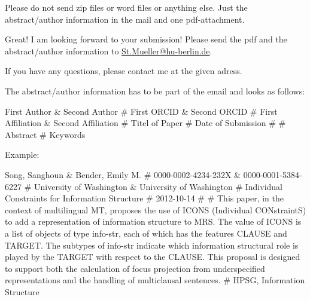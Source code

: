 \documentclass[11pt,a4paper,fleqn]{article}
\begin{document}
Please do not send zip files
or word files or anything else. Just the abstract/author information in the mail and one pdf-attachment.



Great! I am looking forward to your submission!
Please send the pdf and the abstract/author information to\newline
\href{mailto:St.Mueller@hu-berlin.de}{St.Mueller@hu-berlin.de}. 


If you have any questions, please contact me at the given adress.

\newpage

\noindent
The abstract/author information has to be part of the email and looks as follows:

First Author \& Second Author \# First ORCID \& Second ORCID \# First Affiliation \& Second Affiliation \# Titel of Paper \# Date of
Submission \# \# Abstract \# Keywords

\bigskip

Example:

\medskip
\noindent
Song, Sanghoun \& Bender, Emily M. \# 0000-0002-4234-232X \& 0000-0001-5384-6227 \# University of Washington \& University of Washington \#
Individual Constraints for Information Structure \# 2012-10-14 \# \#
This paper, in the context of multilingual MT, proposes the use of ICONS
(Individual CONstraintS) to add a representation of information structure to
MRS. The value of ICONS is a list of objects of type info-str, each of which
has the features CLAUSE and TARGET. The subtypes of info-str indicate
which information structural role is played by the TARGET with respect
to the CLAUSE. This proposal is designed to support both the calculation
of focus projection from underspecified representations and the handling of
multiclausal sentences. \# HPSG, Information Structure

\medskip



% 
%
\end{document}
